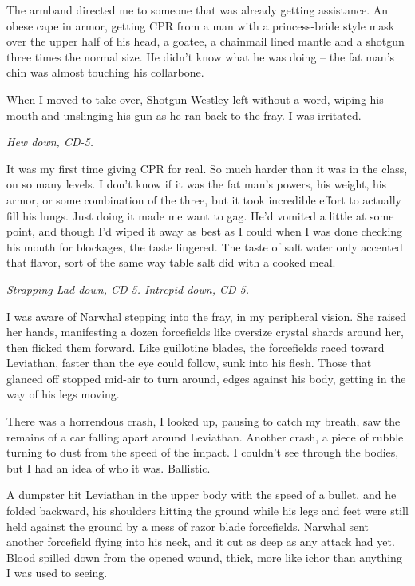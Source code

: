 The armband directed me to someone that was already getting assistance.  An obese cape in armor, getting CPR from a man with a princess-bride style mask over the upper half of his head, a goatee, a chainmail lined mantle and a shotgun three times the normal size.  He didn't know what he was doing – the fat man's chin was almost touching his collarbone.



When I moved to take over, Shotgun Westley left without a word, wiping his mouth and unslinging his gun as he ran back to the fray.  I was irritated.



\emph{Hew down, CD-5.}



It was my first time giving CPR for real.  So much harder than it was in the class, on so many levels.  I don't know if it was the fat man's powers, his weight, his armor, or some combination of the three, but it took incredible effort to actually fill his lungs.  Just doing it made me want to gag.  He'd vomited a little at some point, and though I'd wiped it away as best as I could when I was done checking his mouth for blockages, the taste lingered.  The taste of salt water only accented that flavor, sort of the same way table salt did with a cooked meal.



\emph{Strapping Lad down, CD-5. Intrepid down, CD-5.}



I was aware of Narwhal stepping into the fray, in my peripheral vision.  She raised her hands, manifesting a dozen forcefields like oversize crystal shards around her, then flicked them forward.  Like guillotine blades, the forcefields raced toward Leviathan, faster than the eye could follow, sunk into his flesh.  Those that glanced off stopped mid-air to turn around, edges against his body, getting in the way of his legs moving.



There was a horrendous crash, I looked up, pausing to catch my breath, saw the remains of a car falling apart around Leviathan.  Another crash, a piece of rubble turning to dust from the speed of the impact.  I couldn't see through the bodies, but I had an idea of who it was.  Ballistic.



A dumpster hit Leviathan in the upper body with the speed of a bullet, and he folded backward, his shoulders hitting the ground while his legs and feet were still held against the ground by a mess of razor blade forcefields.  Narwhal sent another forcefield flying into his neck, and it cut as deep as any attack had yet.  Blood spilled down from the opened wound, thick, more like ichor than anything I was used to seeing.



